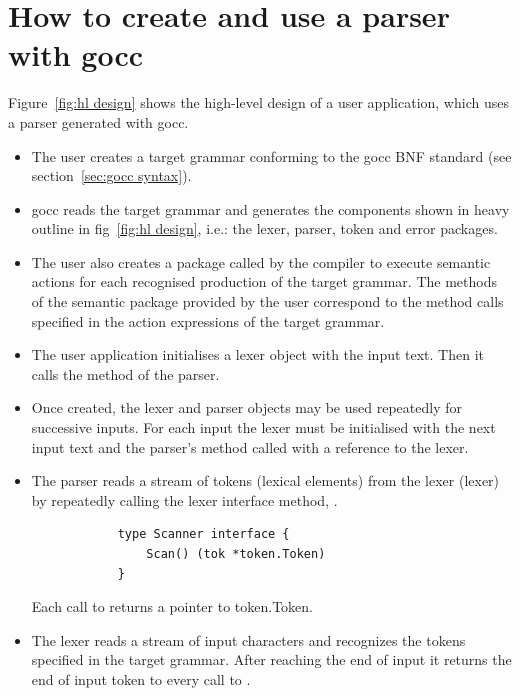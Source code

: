 \documentclass[12pt]{article}
\begin{document}
\section{How to create and use a parser with gocc}
	Figure~\ref{fig:hl design} shows the high-level design of a user application, which uses a parser generated with gocc.
	\begin{itemize}
		\item The user creates a target grammar conforming to the gocc BNF standard (see section~\ref{sec:gocc syntax}).

		\item gocc reads the target grammar and generates the components shown in heavy outline in fig~\ref{fig:hl design}, i.e.: the lexer, parser, token and error packages. 

		\item The user also creates a package called by the compiler to execute semantic actions for each recognised production of the target grammar. The methods of the semantic package provided by the user correspond to the method calls specified in the action expressions of the target grammar.

		\item The user application initialises a lexer object with the input text. Then it calls the  method of the parser.

		\item Once created, the lexer and parser objects may be used repeatedly for successive inputs. For each input the lexer must be initialised with the next input text and the parser's  method called with a reference to the lexer.	

		\item The parser reads a stream of tokens (lexical elements) from the lexer (lexer) by repeatedly calling the lexer interface method, . 

		\begin{verbatim}
			type Scanner interface {
			    Scan() (tok *token.Token)
			}
		\end{verbatim}

		Each call to  returns a pointer to token.Token.

		\item The lexer reads a stream of input characters and recognizes the tokens specified in the target grammar. After reaching the end of input it returns the end of input token to every call to .


\end{itemize}
\end{document}
